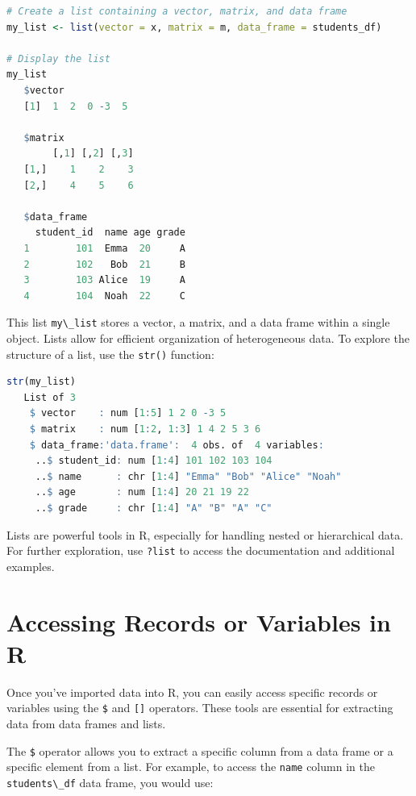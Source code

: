 \documentclass[
]{book}
\newcommand{\passthrough}[1]{#1}
\theoremstyle{definition}
\theoremstyle{definition}
\theoremstyle{definition}
\theoremstyle{definition}
\theoremstyle{remark}
\begin{document}
\begin{lstlisting}[language=R]
# Create a list containing a vector, matrix, and data frame
my_list <- list(vector = x, matrix = m, data_frame = students_df)

# Display the list
my_list
   $vector
   [1]  1  2  0 -3  5
   
   $matrix
        [,1] [,2] [,3]
   [1,]    1    2    3
   [2,]    4    5    6
   
   $data_frame
     student_id  name age grade
   1        101  Emma  20     A
   2        102   Bob  21     B
   3        103 Alice  19     A
   4        104  Noah  22     C
\end{lstlisting}

This list \passthrough{\lstinline!my\_list!} stores a vector, a matrix, and a data frame within a single object. Lists allow for efficient organization of heterogeneous data. To explore the structure of a list, use the \passthrough{\lstinline!str()!} function:

\begin{lstlisting}[language=R]
str(my_list)
   List of 3
    $ vector    : num [1:5] 1 2 0 -3 5
    $ matrix    : num [1:2, 1:3] 1 4 2 5 3 6
    $ data_frame:'data.frame':  4 obs. of  4 variables:
     ..$ student_id: num [1:4] 101 102 103 104
     ..$ name      : chr [1:4] "Emma" "Bob" "Alice" "Noah"
     ..$ age       : num [1:4] 20 21 19 22
     ..$ grade     : chr [1:4] "A" "B" "A" "C"
\end{lstlisting}

Lists are powerful tools in R, especially for handling nested or hierarchical data. For further exploration, use \passthrough{\lstinline!?list!} to access the documentation and additional examples.

\section{Accessing Records or Variables in R}\label{accessing-records-or-variables-in-r}

Once you've imported data into R, you can easily access specific records or variables using the \passthrough{\lstinline!$!} and \passthrough{\lstinline![]!} operators. These tools are essential for extracting data from data frames and lists.

The \passthrough{\lstinline!$!} operator allows you to extract a specific column from a data frame or a specific element from a list. For example, to access the \passthrough{\lstinline!name!} column in the \passthrough{\lstinline!students\_df!} data frame, you would use:
\end{document}

